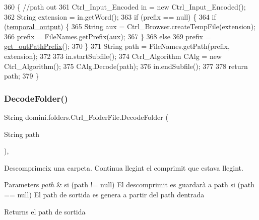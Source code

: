 \begin{DoxyCode}
360                                              \{ \textcolor{comment}{//path out}
361         Ctrl\_Input\_Encoded in = \textcolor{keyword}{new} Ctrl\_Input\_Encoded();
362         String extension = in.getWord();
363         \textcolor{keywordflow}{if} (prefix == null) \{
364             \textcolor{keywordflow}{if} (\hyperlink{classdomini_1_1folders_1_1Ctrl__FolderFile_a0db81590abe27b21a9b8c37633c86fa6}{temporal\_output}) \{
365                 String aux = Ctrl\_Browser.createTempFile(extension);
366                 prefix = FileNames.getPrefix(aux);
367             \}
368             \textcolor{keywordflow}{else}
369                 prefix = \hyperlink{classdomini_1_1folders_1_1Ctrl__FolderFile_a11c6b1b4a25d12b8091c7c96b3da1ea7}{get\_outPathPrefix}();
370         \}
371         String path = FileNames.getPath(prefix, extension);
372 
373         in.startSubfile();
374         Ctrl\_Algorithm CAlg = \textcolor{keyword}{new} Ctrl\_Algorithm();
375         CAlg.Decode(path);
376         in.endSubfile();
377 
378         \textcolor{keywordflow}{return} path;
379     \}
\end{DoxyCode}
\mbox{\label{classdomini_1_1folders_1_1Ctrl__FolderFile_ae8f46feaced983c27c6537794f823dd8}} 
\subsubsection{\texorpdfstring{Decode\+Folder()}{DecodeFolder()}}
{\footnotesize\ttfamily String domini.\+folders.\+Ctrl\+\_\+\+Folder\+File.\+Decode\+Folder (\begin{DoxyParamCaption}\item[{String}]{path }\end{DoxyParamCaption})\hspace{0.3cm}{\ttfamily [inline]}, {\ttfamily [private]}}



Descomprimeix una carpeta. Continua llegint el comprimit que estava llegint. 


\begin{DoxyParams}{Parameters}
{\em path} & si (path != null) El descomprimit es guardarà a path si (path == null) El path de sortida es genera a partir del path d\textquotesingle{}entrada \\
\hline
\end{DoxyParams}
\begin{DoxyReturn}{Returns}
el path de sortida 
\end{DoxyReturn}

